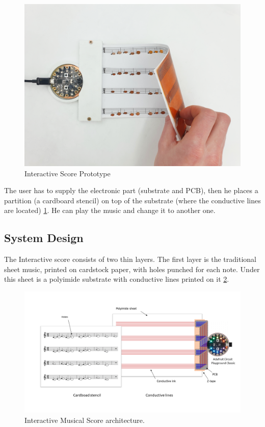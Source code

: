 \begin{figure}[h]
   \centering
   \includegraphics{images/IS_demo.png}
   \caption{Interactive Score Prototype}
   \label{fig:IS_demo}
\end{figure}

The user has to supply the electronic part (substrate and PCB), then he places a partition (a cardboard stencil) on top of the substrate (where
the conductive lines are located) \ref{fig:IS_demo}. He can play the music and change it to another one.

\subsection{System Design}

The Interactive score consists of two thin layers. The first layer is the traditional sheet
music, printed on cardstock paper, with holes punched for each note. Under this sheet
is a polyimide substrate with conductive lines printed on it \ref{fig:IS_schema}.

\begin{figure}[h]
   \centering
   \includegraphics{images/IS_schema.png}
   \caption{Interactive Musical Score architecture.}
   \label{fig:IS_schema}
\end{figure}

